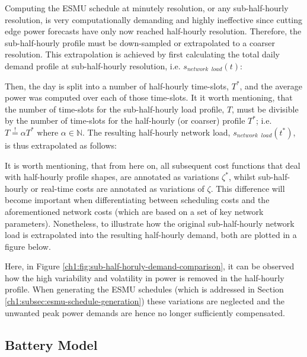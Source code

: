 Computing the ESMU schedule at minutely resolution, or any sub-half-hourly resolution, is very computationally demanding and highly ineffective since cutting edge power forecasts have only now reached half-hourly resolution.
Therefore, the sub-half-hourly profile must be down-sampled or extrapolated to a coarser resolution.
This extrapolation is achieved by first calculating the total daily demand profile at sub-half-hourly resolution, i.e. $s_{network\;\;load}(t)$:



Then, the day is split into a number of half-hourly time-slots, $T^*$, and the average power was computed over each of those time-slots.
It it worth mentioning, that the number of time-slots for the sub-half-hourly load profile, $T$, must be divisible by the number of time-slots for the half-hourly (or coarser) profile $T^*$; i.e. $T \overset{!}{=} \alpha T^* \text{ where } \alpha \in \mathbb{N}$.
The resulting half-hourly network load, $s_{network\;\;load}(t^*)$, is thus extrapolated as follows:



It is worth mentioning, that from here on, all subsequent cost functions that deal with half-hourly profile shapes, are annotated as variations $\zeta^*$, whilst sub-half-hourly or real-time costs are annotated as variations of $\zeta$.
This difference will become important when differentiating between scheduling costs and the aforementioned network costs (which are based on a set of key network parameters).
Nonetheless, to illustrate how the original sub-half-hourly network load is extrapolated into the resulting half-hourly demand, both are plotted in a figure below.



Here, in Figure \ref{ch1:fig:sub-half-horuly-demand-comparison}, it can be observed how the high variability and volatility in power is removed in the half-hourly profile.
When generating the ESMU schedules (which is addressed in Section \ref{ch1:subsec:esmu-schedule-generation}) these variations are neglected and the unwanted peak power demands are hence no longer sufficiently compensated.

\subsection{Battery Model}

